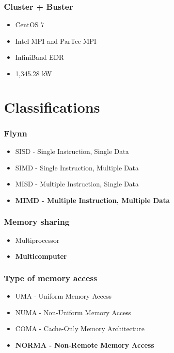 \documentclass{beamer}
\begin{document}
\begin{frame}
  \frametitle{Cluster + Buster}
  \begin{itemize}
    \item CentOS 7
    \item Intel MPI and ParTec MPI
    \item InfiniBand EDR
    \item 1,345.28 kW
  \end{itemize}
\end{frame}


\section{Classifications}

\begin{frame}
  \frametitle{Flynn}
  \begin{itemize}
    \item SISD - Single Instruction, Single Data
    \item SIMD - Single Instruction, Multiple Data
    \item MISD - Multiple Instruction, Single Data
    \item \textbf{MIMD - Multiple Instruction, Multiple Data}
  \end{itemize}
\end{frame}

\begin{frame}
  \frametitle{Memory sharing}
  \begin{itemize}
    \item Multiprocessor
    \item \textbf{Multicomputer}
  \end{itemize}

\end{frame}

\begin{frame}
  \frametitle{Type of memory access}
  \begin{itemize}
    \item UMA - Uniform Memory Access
    \item NUMA - Non-Uniform Memory Access
    \item COMA - Cache-Only Memory Architecture
    \item \textbf{NORMA - Non-Remote Memory Access}
  \end{itemize}

\end{frame}
\end{document}
